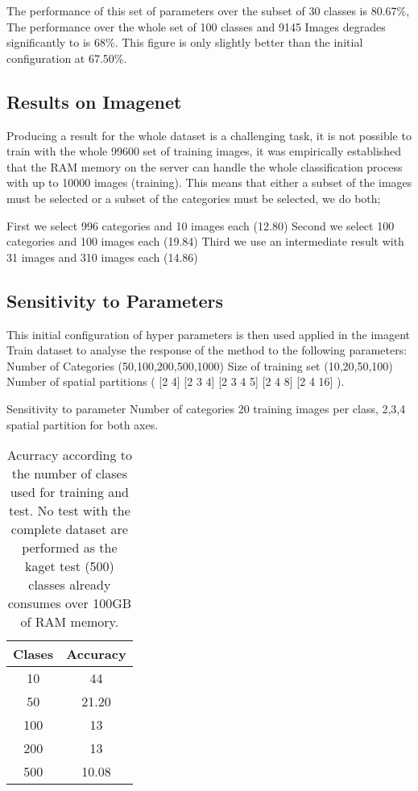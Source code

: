 \documentclass[10pt,twocolumn,letterpaper]{article}
\begin{document}
The performance of this set of parameters over  the subset of 30 classes is 80.67\%, The performance over the whole set of 100 classes and 9145 Images degrades significantly to is 68\%. This figure is only slightly better than the initial configuration at 67.50\%. 

\subsection{Results on Imagenet}

Producing a result for the whole dataset is a challenging task, it is not possible to train with the whole 99600 set of training images, it was empirically established that the RAM memory on the server can handle the whole classification process with up to 10000 images (training).  This means that either a subset of the images must be selected or a subset of the categories must be selected, we do both;

First we select 996 categories and 10 images each (12.80)
Second we select 100 categories and 100 images each (19.84)
Third we use an intermediate result with 31 images and 310 images each (14.86)

\subsection{Sensitivity to Parameters}
This initial configuration of hyper parameters is then used applied in the imagent Train dataset to analyse the response of the method to the following parameters:
Number of Categories (50,100,200,500,1000)
Size of training set (10,20,50,100)
Number of spatial partitions ( [2 4]  [2 3 4]  [2 3 4 5]  [2 4 8]  [2 4 16] ). 

Sensitivity to parameter Number of categories
20 training images per class, 2,3,4 spatial partition for both axes.

\begin{table}[t]
\centering
\begin{tabular}{c | c }
Clases & Accuracy    \\
\hline	
10 & 44  \\
50 & 21.20 \\
100 & 13 \\
200 & 13 \\
500 & 10.08 \\

\end{tabular}
\caption{Acurracy according to the number of clases used for training and test. No test with the complete dataset are performed as the kaget test (500) classes already consumes over 100GB of RAM memory.
}
\label{table:tableClases}
\end{table}
\end{document}
